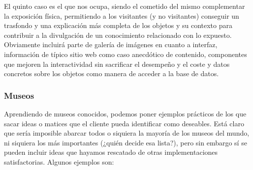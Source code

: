 \par El quinto caso es el que nos ocupa, siendo el cometido del mismo complementar la exposición física, permitiendo a los visitantes (y no visitantes) conseguir un trasfondo y una explicación más completa de los objetos y su contexto para contribuir a la divulgación de un conocimiento relacionado con lo expuesto. Obviamente incluirá parte de galería de imágenes en cuanto a interfaz, información de típico sitio web como caso anecdótico de contenido, componentes que mejoren la interactividad sin sacrificar el desempeño y el coste y datos concretos sobre los objetos como manera de acceder a la base de datos. 

\subsubsection{Museos}

\par Aprendiendo de museos conocidos, podemos poner ejemplos prácticos de los que sacar ideas o matices que el cliente pueda identificar como deseables. Está claro que sería imposible abarcar todos o siquiera la mayoría de los museos del mundo, ni siquiera los más importantes (¿quién decide esa lista?), pero sin embargo sí se pueden incluir ideas que hayamos rescatado de otras implementaciones satisfactorias.
Algunos ejemplos son:

